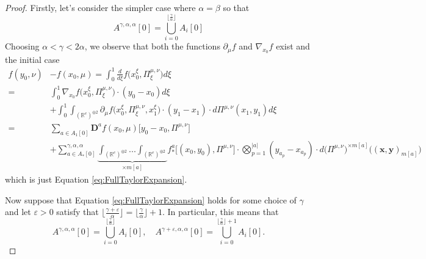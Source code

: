 \documentclass[a4paper,11pt,twoside]{article}
\numberwithin{equation}{section}
\theoremstyle{plain}
\newcommand{\bR}{\mathbb{R}}
\newcommand{\rD}{\mathbf{D}}
\newcommand{\1}{\mathbbm{1}}
\begin{document}
	\begin{proof}
		Firstly, let's consider the simpler case where $\alpha=\beta$ so that
		\begin{equation*}
			A^{\gamma, \alpha, \alpha}[0] = \bigcup_{i=0}^{\big\lfloor \tfrac{\gamma}{\alpha} \big\rfloor } A_i[0]
		\end{equation*}
		Choosing $\alpha <\gamma<2\alpha$, we observe that both the functions $\partial_{\mu} f$ and $\nabla_{x_0} f$ exist and the initial case
		\begin{align*}
			f(y_0, \nu)& - f(x_0, \mu) = \int_0^1 \frac{d}{d\xi} f\Big( x_0^\xi, \Pi_{\xi}^{\mu, \nu}\Big) d\xi
			\\
			=& \int_0^1 \nabla_{x_0} f\Big( x_0^\xi, \Pi_{\xi}^{\mu, \nu}\Big) \cdot (y_0-x_0) d\xi
			\\
			&+\int_0^1 \int_{(\bR^e)^{\oplus 2}} \partial_\mu f\Big( x_0^\xi, \Pi_{\xi}^{\mu, \nu}, x_1^\xi \Big) \cdot (y_1 - x_1) \cdot d\Pi^{\mu, \nu}(x_1, y_1) d\xi
			\\
			=& \sum_{a\in A_{1}[0]} \rD^a f(x_0, \mu)\big[ y_0-x_0, \Pi^{\mu, \nu}\big]
			\\
			&+\sum_{a\in A_{\ast}[0]}^{\gamma, \alpha, \alpha} \underbrace{\int_{(\bR^e)^{\oplus 2}} ... \int_{(\bR^e)^{\oplus 2}}}_{\times m[a]} f_{\ast}^a\big[ (x_0, y_0), \Pi^{\mu, \nu} \big] \cdot \bigotimes_{p=1}^{|a|} ( y_{a_p} - x_{a_p} ) \cdot d\big( \Pi^{\mu, \nu} \big)^{\times m[a]}\Big( (\boldsymbol{x}, \boldsymbol{y})_{m[a]} \Big)
		\end{align*}
		which is just Equation \eqref{eq:FullTaylorExpansion}. 
		
		Now suppose that Equation \eqref{eq:FullTaylorExpansion} holds for some choice of $\gamma$ and let $\varepsilon>0$ satisfy that $\big\lfloor \tfrac{\gamma + \varepsilon}{\alpha} \big\rfloor = \big\lfloor \tfrac{\gamma}{\alpha} \big\rfloor +1$. In particular, this means that
		\begin{equation*}
			A^{\gamma, \alpha, \alpha}[0] = \bigcup_{i=0}^{\big\lfloor \tfrac{\gamma}{\alpha} \big\rfloor} A_i[0], 
			\quad
			A^{\gamma+\varepsilon, \alpha, \alpha}[0] = \bigcup_{i=0}^{\big\lfloor \tfrac{\gamma}{\alpha} \big\rfloor +1} A_i[0]. 
		\end{equation*}
		

\end{proof}
\end{document}

